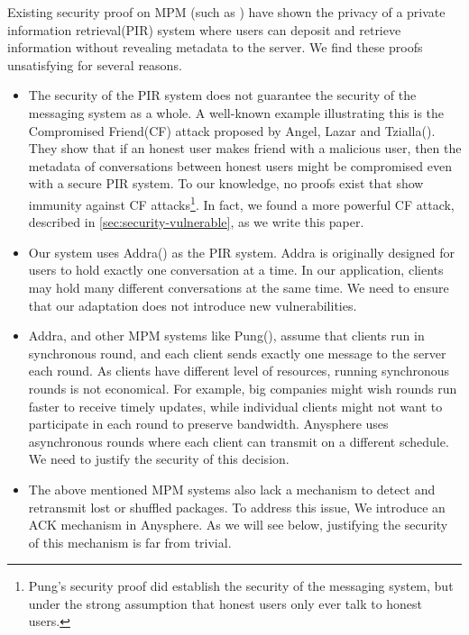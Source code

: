 Existing security proof on MPM (such as \cite{corrigan2010dissent, corrigan2015riposte, angel2016unobservable, ahmad2021addra}) have shown the privacy of a private information retrieval(PIR) system where users can deposit and retrieve information without revealing metadata to the server. We find these proofs unsatisfying for several reasons.
\begin{itemize}
    \item The security of the PIR system does not guarantee the security of the messaging system as a whole. A well-known example illustrating this is the Compromised Friend(CF) attack proposed by Angel, Lazar and Tzialla(\cite{angel2018cf}). They show that if an honest user makes friend with a malicious user, then the metadata of conversations between honest users might be compromised even with a secure PIR system. To our knowledge, no proofs exist that show immunity against CF attacks\footnote{Pung's security proof \cite[Appendix C]{angel2018thesis} did establish the security of the messaging system, but under the strong assumption that honest users only ever talk to honest users.}. In fact, we found a more powerful CF attack, described in \cref{sec:security-vulnerable}, as we write this paper.
    
    \item Our system uses Addra(\cite{ahmad2021addra}) as the PIR system. Addra is originally designed for users to hold exactly one conversation at a time. In our application, clients may hold many different conversations at the same time. We need to ensure that our adaptation does not introduce new vulnerabilities.
    
    \item Addra, and other MPM systems like Pung(\cite{angel2016unobservable}), assume that clients run in synchronous round, and each client sends exactly one message to the server each round. As clients have different level of resources, running synchronous rounds is not economical. For example, big companies might wish rounds run faster to receive timely updates, while individual clients might not want to participate in each round to preserve bandwidth. Anysphere uses asynchronous rounds where each client can transmit on a different schedule. We need to justify the security of this decision.
    
    \item The above mentioned MPM systems also lack a mechanism to detect and retransmit lost or shuffled packages. To address this issue, We introduce an ACK mechanism in Anysphere. As we will see below, justifying the security of this mechanism is far from trivial.
\end{itemize}

